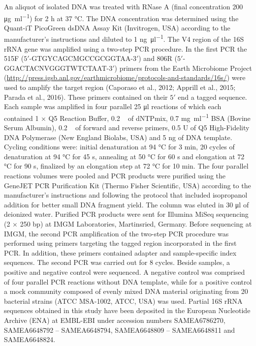 \documentclass[12pt,]{article}
\begin{document}
An aliquot of isolated DNA was treated with RNase A (final concentration
200 \si{\ug\per\ml}) for 2 \si{\hour} at 37 \si{\degreeCelsius}. The DNA
concentration was determined using the Quant-iT PicoGreen dsDNA Assay
Kit (Invitrogen, USA) according to the manufacturer's instructions and
diluted to 1 \si{\ng\per\ul}. The V4 region of the 16S rRNA gene was
amplified using a two-step PCR procedure. In the first PCR the 515F
(\(5'\)-GTGYCAGCMGCCGCGGTAA-\(3'\)) and 806R
(\(5'\)-GGACTACNVGGGTWTCTAAT-\(3'\)) primers from the Earth Microbiome
Project
(\url{http://press.igsb.anl.gov/earthmicrobiome/protocols-and-standards/16s/})
were used to amplify the target region (Caporaso et al., 2012; Apprill
et al., 2015; Parada et al., 2016). These primers contained on their
\(5'\) end a tagged sequence. Each sample was amplified in four parallel
25 \si{\ul} reactions of which each contained 1 × Q5 Reaction Buffer,
0.2 \si{\milli\Molar} of dNTPmix, 0.7 \si{\mg\per\ml} BSA (Bovine Serum
Albumin), 0.2 \si{\micro\Molar} of forward and reverse primers, 0.5 U of
Q5 High-Fidelity DNA Polymerase (New England Biolabs, USA) and 5
\si{\ng} of DNA template. Cycling conditions were: initial denaturation
at 94 \si{\degreeCelsius} for 3 \si{\minute}, 20 cycles of denaturation
at 94 \si{\degreeCelsius} for 45 \si{\s}, annealing at 50
\si{\degreeCelsius} for 60 \si{\s} and elongation at 72
\si{\degreeCelsius} for 90 \si{\s}, finalized by an elongation step at
72 \si{\degreeCelsius} for 10 \si{\minute}. The four parallel reactions
volumes were pooled and PCR products were purified using the GeneJET PCR
Purification Kit (Thermo Fisher Scientific, USA) according to the
manufacturer's instructions and following the protocol that included
isopropanol addition for better small DNA fragment yield. The column was
eluted in 30 \si{\ul} of deionized water. Purified PCR products were
sent for Illumina MiSeq sequencing (2 × 250 bp) at IMGM Laboratories,
Martinsried, Germany. Before sequencing at IMGM, the second PCR
amplification of the two-step PCR procedure was performed using primers
targeting the tagged region incorporated in the first PCR. In addition,
these primers contained adapter and sample-specific index sequences. The
second PCR was carried out for 8 cycles. Beside samples, a positive and
negative control were sequenced. A negative control was comprised of
four parallel PCR reactions without DNA template, while for a positive
control a mock community composed of evenly mixed DNA material
originating from 20 bacterial strains (ATCC MSA-1002, ATCC, USA) was
used. Partial 16S rRNA sequences obtained in this study have been
deposited in the European Nucleotide Archive (ENA) at EMBL-EBI under
accession numbers SAMEA6786270, SAMEA6648792 -- SAMEA6648794,
SAMEA6648809 -- SAMEA6648811 and SAMEA6648824.
\end{document}

